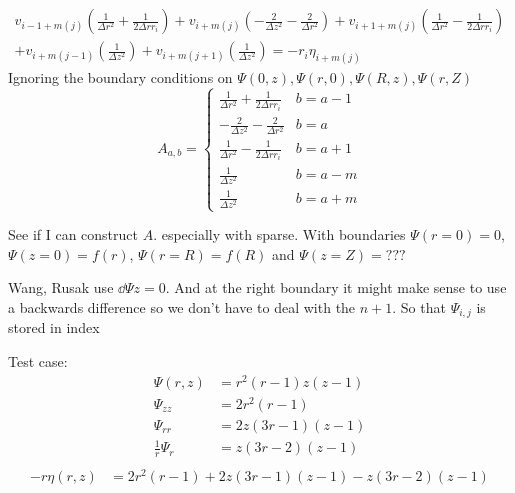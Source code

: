 \documentclass{X:/Documents/Coding/Latex/myreport}
\begin{document}
\begin{align*}
        v_{i-1+m(j)}\left(\frac{1}{\Delta r^2} + \frac{1}{2\Delta r r_i}\right) + v_{i+m(j)} \left(-\frac{2}{\Delta z^2} - \frac{2}{\Delta r^2}\right) + v_{i+1+m(j)} \left(\frac{1}{\Delta r^2} - \frac{1}{2\Delta r r_i}\right)\\
        + v_{i+m(j-1)} \left(\frac{1}{\Delta z^2}\right) + v_{i+m(j+1)}\left(\frac{1}{\Delta z^2}\right) = -r_i \eta_{i+m(j)}
\end{align*}
Ignoring the boundary conditions on $\Psi(0,z), \Psi(r,0), \Psi(R,z), \Psi(r,Z)$
\[A_{a,b} = \begin{cases}
    \frac{1}{\Delta r^2} + \frac{1}{2\Delta r r_i}  & b = a - 1 \\
    -\frac{2}{\Delta z^2} - \frac{2}{\Delta r^2}    & b = a \\
    \frac{1}{\Delta r^2} - \frac{1}{2\Delta r r_i}  & b = a + 1 \\
    \frac{1}{\Delta z^2}                            & b = a - m \\
    \frac{1}{\Delta z^2}                            & b = a + m 
\end{cases}\]

See if I can construct $A$. especially with sparse.
With boundaries $\Psi(r=0) = 0$, $\Psi(z=0) = f(r)$, $\Psi(r=R) = f(R)$ and $\Psi(z=Z) = ???$

Wang, Rusak use $\dd\Psi z = 0$. And at the right boundary it might make sense to use a backwards difference so we don't have to deal with the $n+1$.
So that $\Psi_{i,j}$ is stored in index 

Test case:
\begin{align*}
    \Psi(r,z) &= r^2(r-1)z(z-1)\\
    \Psi_{zz} &= 2r^2(r-1)\\
    \Psi_{rr} &= 2z(3r-1)(z-1)\\
    \frac1r \Psi_r    &= z(3r-2)(z-1)\\
\end{align*}
\begin{align*}
    -r \eta(r,z) &= 2r^2(r-1) + 2z(3r-1)(z-1) - z(3r-2)(z-1)
\end{align*}
\end{document}

